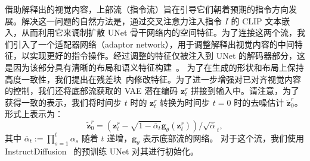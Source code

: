 借助解释出的视觉内容，上部流（指令流）旨在引导它们朝着预期的指令方向发展。解决这一问题的自然方法是，通过交叉注意力注入指令 $I$ 的 CLIP 文本嵌入，从而利用它来调制扩散 UNet 骨干网络内的空间特征。为了连接这两个流，我们引入了一个适配器网络（adaptor network），用于调整解释出视觉内容的中间特征，以实现更好的指令操作。经过调整的特征仅被注入到 UNet 的解码器部分，这是因为该部分具有清晰的布局和语义特征构建~\cite{zhang2023adding}。
为了在生成的形状和布局上保持高度一致性，我们提出在残差块~\cite{tumanyan2023plug}内修改特征。为了进一步增强对已对齐视觉内容的控制，我们还将底部流获取的 VAE 潜在编码 $\textbf{z}_t^r$ 拼接到输入中。请注意，为了获得一致的表示，我们将时间步 $t$ 时的 $\textbf{z}_t^r$ 转换为时间步 $t=0$ 时的去噪估计 $\tilde{\textbf{z}}_0^r$。形式上表示为：
\begin{equation}
    \tilde{\textbf{z}}_0^r = (\textbf{z}_t^r - \sqrt{1-\overline{\alpha}_t} \bm{g}_{\theta} (\textbf{z}_t^r)) / \sqrt{\overline{\alpha}}_t,
\end{equation}
其中 $\overline{\alpha}_t := \prod_{s=1}^t \alpha_s$ 随着 $t$ 递增，$\bm{g}_{\theta}$ 表示底部流的网络。
对于这个流，我们使用 InstructDiffusion~\cite{geng2023instructdiffusion} 的预训练 UNet 对其进行初始化。

